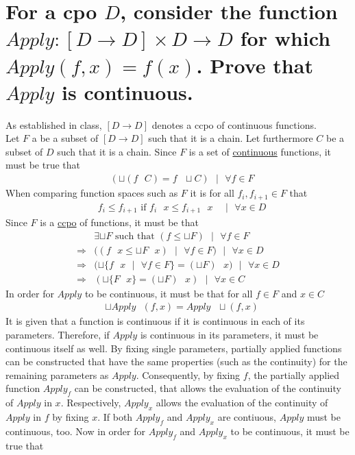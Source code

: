 \section{For a cpo $D$, consider the function $Apply: [D \rightarrow D] \times D \rightarrow D$ for which $Apply (f, x) = f(x)$. Prove that $Apply$ is continuous.}

As established in class, $[D \rightarrow D]$  denotes a ccpo of continuous functions. \\
Let $F$ a be a subset of $[D \rightarrow D]$ such that it is a chain. Let furthermore $C$ be a subset of $D$ such that it is a chain. Since $F$ is a set of \underline{continuous} functions, it must be true that
\begin{align}
	& ( \sqcup ( f \text{ } C ) = f \text{ } \sqcup C ) \text{ } | \text{ } \forall f \in F \label{eq:cont:given:x}
\end{align}
When comparing function spaces such as $F$ it is for all $f_i,f_{i+1} \in F$ that
\begin{align}
	& f_i \leq f_{i+1} \text{ if } f_i \text{ } x \leq f_{i+1} \text{ } x \text{ } \text{ } | \text{ } \forall x \in D
\end{align}
Since $F$ is a \underline{ccpo} of functions, it must be that
\begin{align}
						& \exists \sqcup F \text{ such that } ( f \leq \sqcup F ) \text{ } | \text{ } \forall f \in F \\
\Rightarrow & (( f \text{ } x \leq \sqcup F \text{ } x ) \text{ } | \text{ } \forall f \in F ) \text{ } | \text{ } \forall x \in D \\
\Rightarrow	& ( \sqcup \{ f \text{ } x \text{ } | \text{ } \forall f \in F \} = ( \sqcup F ) \text{ } x ) \text{ } | \text{ } \forall x \in D \\
\Rightarrow	& ( \sqcup \{ F \text{ } x \} = (\sqcup F) \text{ } x ) \text{ } | \text{ } \forall x \in C \label{eq:cont:given:f}
\end{align}
In order for $Apply$ to be continuous, it must be that for all $f \in F$ and $x \in C$
\begin{align}
	& \sqcup Apply \text{ } (f,x) = Apply \text{ } \sqcup (f,x)
\end{align}
It is given that a function is continuous if it is continuous in each of its parameters. Therefore, if $Apply$ is continuous in its parameters, it must be continuous itself as well. By fixing single parameters, partially applied functions can be constructed that have the same properties (such as the continuity) for the remaining parameters as $Apply$. Consequently, by fixing $f$, the partially applied function $Apply_f$ can be constructed, that allows the evaluation of the continuity of $Apply$ in $x$. Respectively, $Apply_x$ allows the evaluation of the continuity of $Apply$ in $f$ by fixing $x$. If both $Apply_f$ and $Apply_x$ are contiuous, $Apply$ must be continuous, too. Now in order for $Apply_f$ and $Apply_x$ to be continuous, it must be true that
